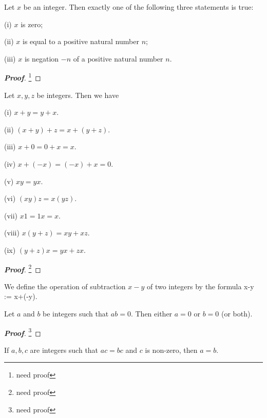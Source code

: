 \begin{lemma}
Let $x$ be an integer. Then exactly one of the following three statements is true:
\ben
\item [(i)] $x$ is zero;
\item [(ii)] $x$ is equal to a positive natural number $n$;
\item [(iii)] $x$ is negation $-n$ of a positive natural number $n$.
\een
\end{lemma}

\begin{proof}[\bf Proof]
\footnote{need proof}
\end{proof}

\begin{proposition}
Let $x,y,z$ be integers. Then we have
\ben
\item [(i)] $x+y = y+x$.
\item [(ii)] $(x+y) + z = x+(y+z)$.
\item [(iii)] $x+0=0+x = x$.
\item [(iv)] $x+(-x) = (-x)+x = 0$.
\item [(v)] $xy = yx$.
\item [(vi)] $(xy)z = x(yz)$.
\item [(vii)] $x1 = 1x = x$.
\item [(viii)] $x(y+z) = xy + xz$.
\item [(ix)] $(y+z)x = yx + zx$.
\een
\end{proposition}

\begin{proof}[\bf Proof]
\footnote{need proof}
\end{proof}

\begin{definition}[subtraction]
We define the operation of subtraction $x-y$ of two integers by the formula
\be
x-y := x+(-y).
\ee
\end{definition}

\begin{proposition}
Let $a$ and $b$ be integers such that $ab = 0$. Then either $a=0$ or $b=0$ (or both).
\end{proposition}

\begin{proof}[\bf Proof]
\footnote{need proof}
\end{proof}

\begin{corollary}
If $a,b,c$ are integers such that $ac = bc$ and $c$ is non-zero, then $a=b$.
\end{corollary}

